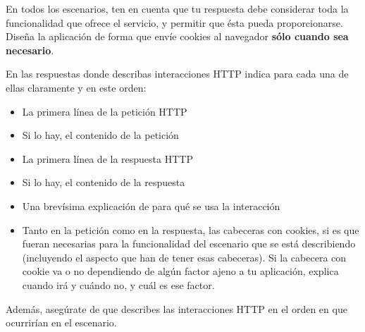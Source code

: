En todos los escenarios, ten en cuenta que tu respuesta debe considerar toda la funcionalidad que ofrece el servicio, y permitir que ésta pueda proporcionarse. Diseña la aplicación de forma que envíe cookies al navegador {\bf sólo cuando sea necesario}.

En las respuestas donde describas interacciones HTTP indica para cada una de ellas claramente y en este orden:
    \begin{itemize}
    \item La primera línea de la petición HTTP
    \item Si lo hay, el contenido de la petición
    \item La primera línea de la respuesta HTTP
    \item Si lo hay, el contenido de la respuesta
    \item Una brevísima explicación de para qué se usa la interacción
    \item Tanto en la petición como en la respuesta, las cabeceras con cookies, si es que fueran necesarias para la funcionalidad del escenario que se está describiendo (incluyendo el aspecto que han de tener esas cabeceras). Si la cabecera con cookie va o no dependiendo de algún factor ajeno a tu aplicación, explica cuando irá y cuándo no, y cuál es ese factor.
    \end{itemize}

Además, asegúrate de que describes las interacciones HTTP en el orden en que ocurrirían en el escenario.

